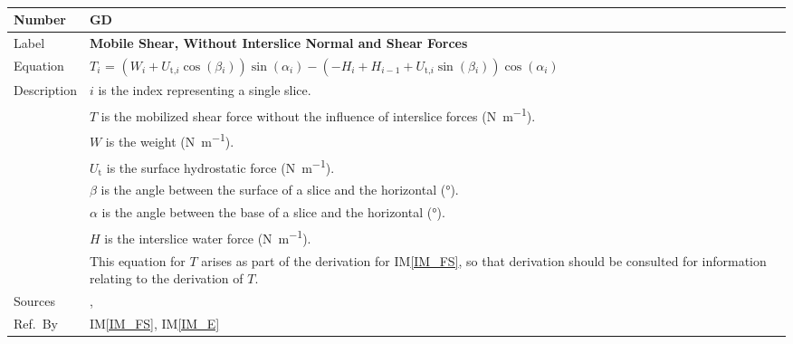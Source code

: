 \documentclass[12pt]{article}
\newcommand{\colAwidth}{0.13\textwidth}
\newcommand{\colBwidth}{0.82\textwidth}
\renewcommand{\arraystretch}{1}
\newcommand{\iref}[1]{IM\ref{#1}}
\newcounter{defnum} %
\begin{document}

~\newline




\noindent
\begin{minipage}{\textwidth}
	\renewcommand*{\arraystretch}{1.5}
	\begin{tabular}{| p{\colAwidth} | p{\colBwidth} |}
		
		\hline
		\rowcolor[gray]{0.9}
		Number& GD{defnum}\thedefnum \label{GD_T}\\
		
		\hline
		Label& \bf Mobile Shear, Without Interslice Normal and Shear Forces \\
		
		\hline
		Equation &
		$T_i$ = 
		$\left(W_{i}+{U_{\text{t,}i}}\cos\left(\beta{}_{i}\right)\right)\sin\left(\alpha{}_{i}
		\right)-\left(- H_{i} + H_{i-1} 
		+{U_{\text{t,}i}}\sin\left(\beta{}_{i}\right)
		\right)\cos\left(\alpha{}_{i}\right)$
		\\ 
		
		\hline Description &$i$ is the index representing a single slice.\\ 
		&$T$ is the mobilized shear force without the influence of interslice 
		forces 
		(\si{\newton\per\meter}).\\
		&$W$ is the weight (\si{\newton\per\meter}).\\
		&${U_{\text{t}}}$ is the surface hydrostatic force 
		(\si{\newton\per\meter}).\\ 
		&$\beta{}$ is the angle between the surface of a slice and the 
		horizontal 
		(\si{\degree}).\\
		&$\alpha{}$ is the angle between the base of a slice and the horizontal 
		(\si{\degree}).\\
		&$H$ is the interslice water force (\si{\newton\per\meter}).\\
		&This equation for $T$ arises as part of the derivation for 
		\iref{IM_FS}, so that derivation should be consulted for information 
		relating to the derivation of $T$.\\
		
		\hline
		Sources& \cite{ZhuEtAl2005}, \cite{Karchewski2012}\\
		
		\hline Ref.\ By & \iref{IM_FS}, \iref{IM_E}\\
		
		\hline
	\end{tabular}
\end{minipage}\\
\end{document}
